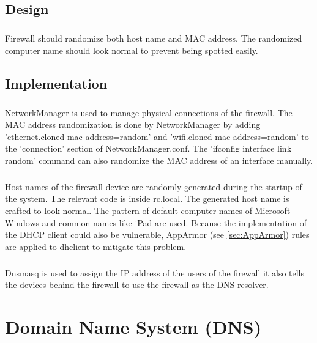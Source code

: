 \documentclass[mscthesis]{usiinfthesis}
\begin{document}
\section{Design}
\paragraph{}
Firewall should randomize both host name and MAC address. The randomized computer name should look normal to prevent being spotted easily.


\section{Implementation}
\paragraph{}
NetworkManager is used to manage physical connections of the firewall. The MAC address randomization is done by NetworkManager by adding 'ethernet.cloned-mac-address=random' and 'wifi.cloned-mac-address=random' to the 'connection' section of NetworkManager.conf. The 'ifconfig interface link random' command can also randomize the MAC address of an interface manually.
\paragraph{}
Host names of the firewall device are randomly generated during the startup of the system. The relevant code is inside rc.local. The generated host name is crafted to look normal. The pattern of default computer names of Microsoft Windows and common names like iPad are used. Because the implementation of the DHCP client could also be vulnerable, AppArmor (see \cref{sec:AppArmor}) rules are applied to dhclient to mitigate this problem.
\paragraph{}
Dnsmasq is used to assign the IP address of the users of the firewall it also tells the devices behind the firewall to use the firewall as the DNS resolver.

\chapter{Domain Name System (DNS)}\label{cha:dns}
\end{document}
